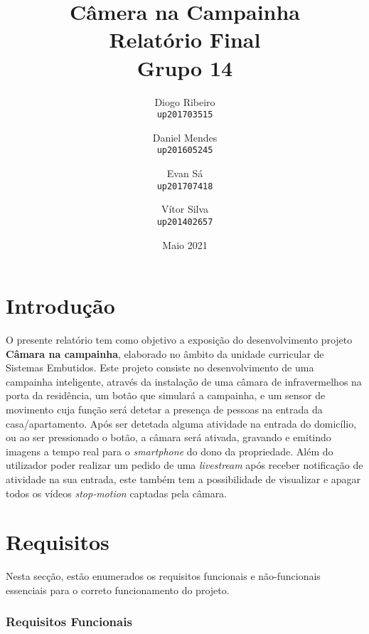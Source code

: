 \documentclass{article}
\title{Câmera na Campainha \\ Relatório Final \\ Grupo 14}
\author{Diogo Ribeiro \\\texttt{up201703515} \and Daniel Mendes\\\texttt{up201605245} \and Evan Sá\\\texttt{up201707418} \and Vítor Silva\\\texttt{up201402657}}
\date{Maio 2021}
\begin{document}
\maketitle

\section{Introdução}
\vspace{2mm}
\hspace{0.5cm} O presente relatório tem como objetivo a exposição do desenvolvimento projeto \textbf{Câmara na campainha}, elaborado no âmbito da unidade curricular de Sistemas Embutidos. Este projeto consiste no desenvolvimento de uma campainha inteligente, através da instalação de uma câmara de infravermelhos na porta da residência, um botão que simulará a campainha, e um sensor de movimento cuja função será detetar a presença de pessoas na entrada da casa/apartamento. Após ser detetada alguma atividade na entrada do domicílio, ou ao ser pressionado o botão, a câmara será ativada, gravando e emitindo imagens a tempo real para o \textit{smartphone} do dono da propriedade. Além do utilizador poder realizar um pedido de uma \textit{livestream} após receber notificação de atividade na sua entrada, este também tem a possibilidade de visualizar e apagar todos os vídeos \textit{stop-motion} captadas pela câmara.

\iffalse
\section{Requisitos}
\vspace{2mm}
\hspace{0.5cm} Nesta secção, estão enumerados os requisitos funcionais e não-funcionais essenciais para o correto funcionamento do projeto.

\subsubsection{Requisitos Funcionais}
\vspace{2mm}
\end{document}
